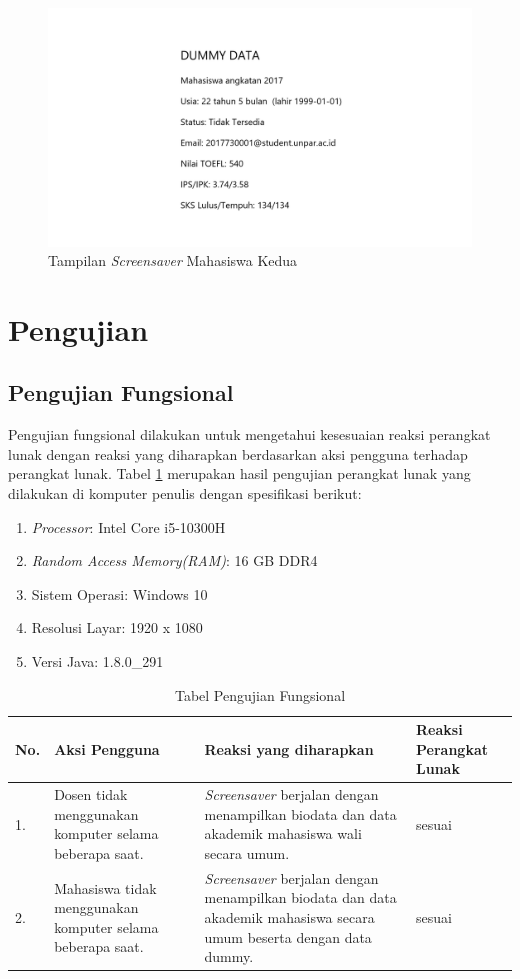 \begin{figure}[H]
	\centering
	\includegraphics[scale=0.3]{Gambar/hasil2.png}
	\caption{Tampilan \textit{Screensaver} Mahasiswa Kedua}
	\label{fig:5_hasil2}
\end{figure}


\section{Pengujian}

\subsection{Pengujian Fungsional}
Pengujian fungsional dilakukan untuk mengetahui kesesuaian reaksi perangkat lunak dengan reaksi yang diharapkan berdasarkan aksi pengguna terhadap perangkat lunak. Tabel \ref{table:hasilFungsional} merupakan hasil pengujian perangkat lunak yang dilakukan di komputer penulis dengan spesifikasi berikut:
\begin{enumerate}
    \item \textit{Processor}: Intel Core i5-10300H
    \item \textit{Random Access Memory(RAM)}: 16 GB DDR4
    \item Sistem Operasi: Windows 10
    \item Resolusi Layar: 1920 x 1080
    \item Versi Java: 1.8.0\_291
\end{enumerate}

\begin{table}[H]
	\centering
	\caption{Tabel Pengujian Fungsional}
	\begin{tabular}{|p{0.5cm}| p{5.5cm}| p{5.5cm}| p{3cm}|} \hline
	No.	&	Aksi Pengguna	&	Reaksi yang diharapkan	&	Reaksi Perangkat Lunak \\ \hline
	1.	&	Dosen tidak menggunakan komputer selama beberapa saat. 	&	\textit{Screensaver} berjalan dengan menampilkan biodata dan data akademik mahasiswa wali secara umum.	&	sesuai	\\ \hline
	2.	&	Mahasiswa tidak menggunakan komputer selama beberapa saat. 	&	\textit{Screensaver} berjalan dengan menampilkan biodata dan data akademik mahasiswa secara umum beserta dengan data dummy.	&	sesuai	\\ \hline
	\end{tabular}
	\label{table:hasilFungsional}
\end{table}


